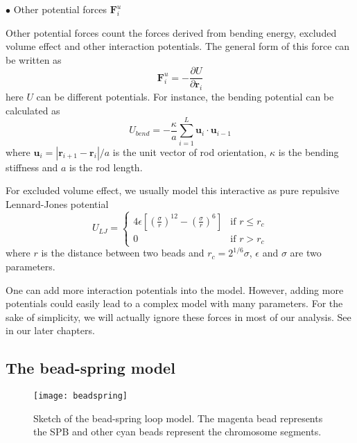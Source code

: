 $\bullet$ Other potential forces $\mathbf{F}_i^{u}$

Other potential forces count the forces derived from bending energy, excluded volume effect and other interaction potentials. The general form of this force can be written as
\begin{equation}
    \label{eq:potentialForce}
        \mathbf{F}_i^{u} = -\frac{\partial U}{\partial\mathbf{r}_i}
\end{equation}
here $U$ can be different potentials. For instance, the bending potential can be calculated as 
\begin{equation}
    \label{eq:bending}
    U_{bend} = - \frac{\kappa}{a} \sum_{i=1}^{L} \mathbf{u}_i \cdot \mathbf{u}_{i-1}
\end{equation}
where $\mathbf{u}_i = |\mathbf{r}_{i+1} - \mathbf{r}_{i}|/a$ is the unit vector of rod orientation, $\kappa$ is the bending stiffness and $a$ is the rod length.

For excluded volume effect, we usually model this interactive as pure repulsive Lennard-Jones potential
\begin{equation}
    \label{eq:lennardJones}
    U_{LJ} =  
    \begin{cases} 
        4\epsilon\left[\left(\frac{\sigma}{r}\right)^{12} -  \left(\frac{\sigma}{r}\right)^6\right] 
        & \text{if } r \leq r_c \\
        0       & \text{if } r > r_c 
  \end{cases}
\end{equation}
where $r$ is the distance between two beads and $r_c = 2^{1/6}\sigma$, $\epsilon$ and $\sigma$ are two parameters.

One can add more interaction potentials into the model. However, adding more potentials could easily lead to a complex model with many parameters. For the sake of simplicity, we will actually ignore these forces in most of our analysis. See in our later chapters.


\subsection{The bead-spring model}
\label{sub:the_bead_spring_model}

\begin{figure}[htpb]
    \centering
    \texttt{[image: beadspring]}
    \caption{Sketch of the bead-spring loop model. The magenta bead represents the SPB and other cyan beads represent the chromosome segments.}
    \label{fig:beadspring}
\end{figure}


